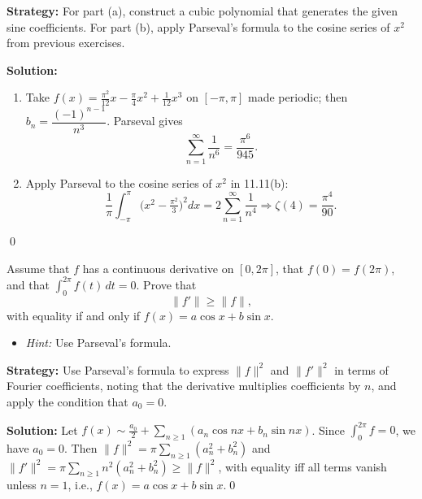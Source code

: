 \noindent\textbf{Strategy:} For part (a), construct a cubic polynomial that generates the given sine coefficients. For part (b), apply Parseval's formula to the cosine series of $x^2$ from previous exercises.

\bigskip\noindent\textbf{Solution:}
\begin{enumerate}[label=(\alph*)]
\item Take $f(x)=\tfrac{\pi^2}{12}x-\tfrac{\pi}{4}x^2+\tfrac{1}{12}x^3$ on $[-\pi,\pi]$ made periodic; then $b_n=\dfrac{(-1)^{n-1}}{n^3}$. Parseval gives
\[\sum_{n=1}^{\infty}\frac{1}{n^6}=\frac{\pi^6}{945}.\]
\item Apply Parseval to the cosine series of $x^2$ in 11.11(b):
\[\frac{1}{\pi}\int_{-\pi}^{\pi}\big(x^2-\tfrac{\pi^2}{3}\big)^2 dx = 2\sum_{n=1}^{\infty}\frac{1}{n^4}\Rightarrow \zeta(4)=\frac{\pi^4}{90}.\]
\end{enumerate}\qed


\begin{problembox}
\begin{problemstatement}
Assume that $f$ has a continuous derivative on $[0, 2\pi]$, that $f(0) = f(2\pi)$, and that $\int_0^{2\pi} f(t) \, dt = 0$. Prove that
\[
\|f'\| \geq \|f\|,
\]
with equality if and only if $f(x) = a \cos x + b \sin x$.
\begin{itemize}
\item \textit{Hint:} Use Parseval's formula.
\end{itemize}
\end{problemstatement}
\end{problembox}

\noindent\textbf{Strategy:} Use Parseval's formula to express $\|f\|^2$ and $\|f'\|^2$ in terms of Fourier coefficients, noting that the derivative multiplies coefficients by $n$, and apply the condition that $a_0=0$.

\bigskip\noindent\textbf{Solution:}
Let $f(x)\sim \tfrac{a_0}{2}+\sum_{n\ge1}(a_n\cos nx+b_n\sin nx)$. Since $\int_0^{2\pi}f=0$, we have $a_0=0$. Then $\|f\|^2=\pi\sum_{n\ge1}(a_n^2+b_n^2)$ and $\|f'\|^2=\pi\sum_{n\ge1} n^2(a_n^2+b_n^2)\ge\|f\|^2$, with equality iff all terms vanish unless $n=1$, i.e., $f(x)=a\cos x+b\sin x$.\qed


